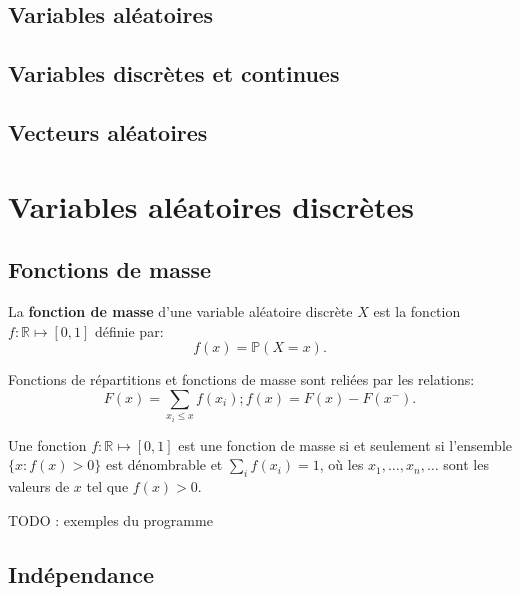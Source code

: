 \documentclass[]{book}
\theoremstyle{definition}
\theoremstyle{definition}
\theoremstyle{definition}
\theoremstyle{remark}
\let\BeginKnitrBlock\begin \let\EndKnitrBlock\end
\begin{document}
\hypertarget{variables-aleatoires-1}{%
\section{Variables aléatoires}\label{variables-aleatoires-1}}

\hypertarget{variables-discretes-et-continues}{%
\section{Variables discrètes et continues}\label{variables-discretes-et-continues}}

\hypertarget{vecteurs-aleatoires}{%
\section{Vecteurs aléatoires}\label{vecteurs-aleatoires}}

\hypertarget{variables-aleatoires-discretes}{%
\chapter{Variables aléatoires discrètes}\label{variables-aleatoires-discretes}}

\hypertarget{fonctions-de-masse}{%
\section{Fonctions de masse}\label{fonctions-de-masse}}

\BeginKnitrBlock{definition}
\protect\hypertarget{def:unnamed-chunk-1}{}{\label{def:unnamed-chunk-1} }La \textbf{fonction de masse} d'une variable aléatoire discrète \(X\) est la fonction \(f : \mathbb{R} \mapsto \left[0 ,1 \right]\) définie par:
\[
f(x) = \mathbb{P}(X=x) .
\]
\EndKnitrBlock{definition}

Fonctions de répartitions et fonctions de masse sont reliées par les relations:
\[
F(x) = \sum_{x_i \leq x} f(x_i) ; f(x) = F(x) - F(x^{-}) .
\]

\BeginKnitrBlock{lemma}
\protect\hypertarget{lem:unnamed-chunk-2}{}{\label{lem:unnamed-chunk-2} }Une fonction \(f : \mathbb{R} \mapsto \left[0 ,1 \right]\) est une fonction de masse si et seulement si l'ensemble \(\lbrace x : f(x) >0 \rbrace\) est dénombrable et \(\sum_{i} f(x_i) = 1\), où les \(x_1, \ldots, x_n, \ldots\) sont les valeurs de \(x\) tel que \(f(x)>0\).
\EndKnitrBlock{lemma}

TODO : exemples du programme

\hypertarget{independance-1}{%
\section{Indépendance}\label{independance-1}}
\end{document}

